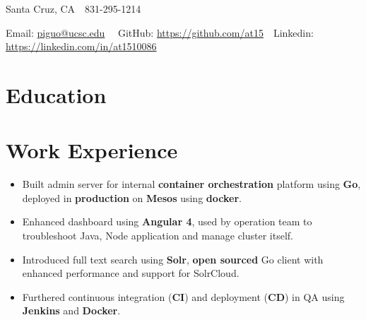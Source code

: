 \documentclass[11pt, letterpaper]{simple-cv}
\begin{document}
\centerline{
Santa Cruz, CA\ \
831-295-1214\ \
}
\centerline{
Email: \href{mailto:piguo@ucsc.edu}{piguo@ucsc.edu}\ \
GitHub: \href{https://github.com/at15}{https://github.com/at15}\ \
Linkedin: \href{https://www.linkedin.com/in/at1510086}{https://linkedin.com/in/at1510086}}

\section{Education}

\section{Work Experience}

\begin{itemize}
\item Built admin server for internal \textbf{container orchestration} platform using \textbf{Go}, deployed in \textbf{production} on \textbf{Mesos} using \textbf{docker}.
\item Enhanced dashboard using \textbf{Angular 4}, used by operation team to troubleshoot Java, Node application and manage cluster itself.
\item Introduced full text search using \textbf{Solr}, \textbf{open sourced} Go client with enhanced performance and support for SolrCloud.
\item Furthered continuous integration (\textbf{CI}) and deployment (\textbf{CD}) in QA using \textbf{Jenkins} and \textbf{Docker}.
\end{itemize}

\end{document}
